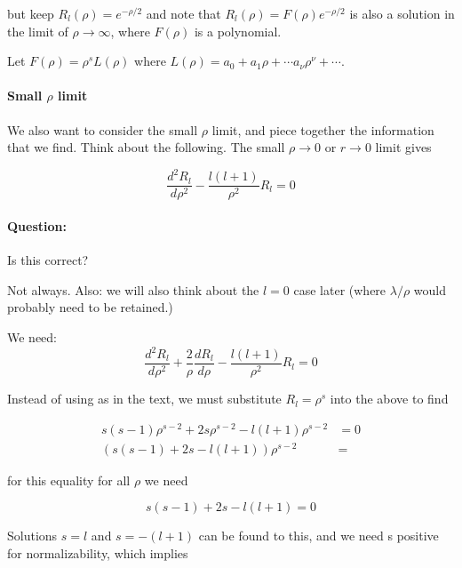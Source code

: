but keep \(R_l(\rho) = e^{-\rho/2}\) and note that \(R_l(\rho) = F(\rho)e^{-\rho/2}\) is also a solution in the limit of \(\rho \rightarrow \infty\), where \(F(\rho)\) is a polynomial.

Let \(F(\rho) = \rho^s L(\rho)\) where \(L(\rho) = a_0 + a_1 \rho + \cdots a_\nu \rho^\nu + \cdots\).

\paragraph{Small \(\rho\) limit}

We also want to consider the small \(\rho\) limit, and piece together the information that we find.  Think about the following.  The small \(\rho \rightarrow 0\) or \(r \rightarrow 0\) limit gives

\begin{equation}\label{eqn:PHY356FLecture10:140}
\frac{d^2 R_l}{d\rho^2} - \frac{l(l+1)}{\rho^2} R_l = 0
\end{equation}

\paragraph{Question:} Is this correct?

Not always.  Also: we will also think about the \(l=0\) case later (where \(\lambda/\rho\) would probably need to be retained.)

We need:
\begin{equation}\label{eqn:PHY356FLecture10:140b}
\frac{d^2 R_l}{d\rho^2} + \frac{2}{\rho} \frac{d R_l}{d\rho} - \frac{l(l+1)}{\rho^2} R_l = 0
\end{equation}

Instead of using  as in the text, we must substitute \(R_l = \rho^s\) into the above to find

\begin{align}\label{eqn:PHY356FLecture10:150}
s(s-1) \rho^{s-2} + 2 s \rho^{s-2} - l(l+1) \rho^{s-2} &= 0 \\
\left( s(s-1) + 2 s - l(l+1) \right) \rho^{s-2} &=
\end{align}

for this equality for all \(\rho\) we need

\begin{equation}\label{eqn:PHY356FLecture10:160}
s(s-1) + 2 s - l(l+1) = 0
\end{equation}

Solutions \(s = l\) and \(s = -(l+1)\) can be found to this, and we need s positive for normalizability, which implies

